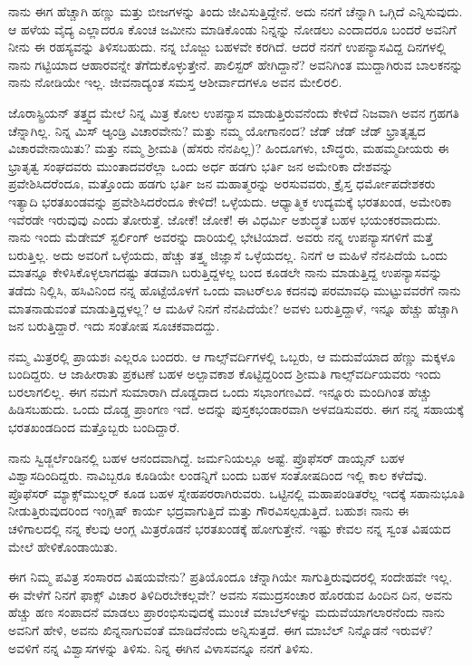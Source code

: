 ನಾನು ಈಗ ಹೆಚ್ಚಾಗಿ ಹಣ್ಣು ಮತ್ತು ಬೀಜಗಳನ್ನು ತಿಂದು ಜೀವಿಸುತ್ತಿದ್ದೇನೆ. ಅದು ನನಗೆ ಚೆನ್ನಾಗಿ ಒಗ್ಗಿದೆ ಎನ್ನಿಸುವುದು. ಆ ಹಳೆಯ ವೈದ್ಯ ಎಲ್ಲಾದರೂ ಕೊಂಚ ಜಮೀನು ಮಾಡಿಕೊಂಡು ನಿನ್ನನ್ನು ನೋಡಲು ಎಂದಾದರೂ ಬಂದರೆ ಅವನಿಗೆ ನೀನು ಈ ರಹಸ್ಯವನ್ನು ತಿಳಿಸಬಹುದು. ನನ್ನ ಬೊಜ್ಜು ಬಹಳವೇ ಕರಗಿದೆ. ಆದರೆ ನನಗೆ ಉಪನ್ಯಾಸವಿದ್ದ ದಿನಗಳಲ್ಲಿ ನಾನು ಗಟ್ಟಿಯಾದ ಆಹಾರವನ್ನೇ ತೆಗೆದುಕೊಳ್ಳುತ್ತೇನೆ. ಪಾಲಿಸ್ಟರ್ ಹೇಗಿದ್ದಾನೆ? ಅವನಿಗಿಂತ ಮುದ್ದಾಗಿರುವ ಬಾಲಕನನ್ನು ನಾನು ನೋಡಿಯೇ ಇಲ್ಲ. ಜೀವನಾದ್ಯಂತ ಸಮಸ್ತ ಆಶೀರ್ವಾದಗಳೂ ಅವನ ಮೇಲಿರಲಿ.

ಜೊರಾಸ್ಟ್ರಿಯನ್ ತತ್ತ್ವದ ಮೇಲೆ ನಿನ್ನ ಮಿತ್ರ ಕೋಲ ಉಪನ್ಯಾಸ ಮಾಡುತ್ತಿರುವನೆಂದು ಕೇಳಿದೆ\enginline{-} ನಿಜವಾಗಿ ಅವನ ಗ್ರಹಗತಿ ಚೆನ್ನಾಗಿಲ್ಲ. ನಿನ್ನ ಮಿಸ್ ಆ್ಯಂಡ್ರಿ ವಿಚಾರವೇನು? ಮತ್ತು ನಮ್ಮ ಯೋಗಾನಂದ? ಜೆಡ್ ಜೆಡ್ ಜೆಡ್ ಭ್ರಾತೃತ್ವದ ವಿಚಾರವೇನಾಯಿತು? ಮತ್ತು ನಮ್ಮ ಶ‍್ರೀಮತಿ\enginline{-} (ಹೆಸರು ನೆನಪಿಲ್ಲ)? ಹಿಂದೂಗಳು, ಬೌದ್ಧರು, ಮಹಮ್ಮದೀಯರು ಈ ಭ್ರಾತೃತ್ವ ಸಂಘದವರು ಮುಂತಾದವರೆಲ್ಲಾ ಒಂದು ಅರ್ಧ ಹಡಗು ಭರ್ತಿ ಜನ ಅಮೇರಿಕಾ ದೇಶವನ್ನು ಪ್ರವೇಶಿಸಿದರೆಂದೂ, ಮತ್ತೊಂದು ಹಡಗು ಭರ್ತಿ ಜನ ಮಹಾತ್ಮರನ್ನು ಅರಸುವವರು, ಕ್ರೈಸ್ತ ಧರ್ಮೋಪದೇಶಕರು ಇತ್ಯಾದಿ ಭರತಖಂಡವನ್ನು ಪ್ರವೇಶಿಸಿದರೆಂದೂ ಕೇಳಿದೆ! ಒಳ್ಳೆಯದು. ಆಧ್ಯಾತ್ಮಿಕ ಉದ್ಯಮಕ್ಕೆ ಭರತಖಂಡ, ಅಮೇರಿಕಾ ಇವೆರಡೇ ಇರುವುವು ಎಂದು ತೋರುತ್ತೆ. ಜೋಕೆ! ಜೋಕೆ! ಈ ವಿಧರ್ಮಿ ಅಶುದ್ಧತೆ ಬಹಳ ಭಯಂಕರವಾದುದು. ನಾನು ಇಂದು ಮೆಡೇಮ್ ಸ್ಟರ್ಲಿಂಗ್ ಅವರನ್ನು ದಾರಿಯಲ್ಲಿ ಭೇಟಿಯಾದೆ. ಅವರು ನನ್ನ ಉಪನ್ಯಾಸಗಳಿಗೆ ಮತ್ತೆ ಬರುತ್ತಿಲ್ಲ. ಅದು ಅವರಿಗೆ ಒಳ್ಳೆಯದು, ಹೆಚ್ಚು ತತ್ತ್ವ ಜಿಜ್ಞಾಸೆ ಒಳ್ಳೆಯದಲ್ಲ. ನಿನಗೆ ಆ ಮಹಿಳೆ ನೆನಪಿದೆಯೆ\enginline{-} ಒಂದು ಮಾತನ್ನೂ ಕೇಳಿಸಿಕೊಳ್ಳಲಾಗದಷ್ಟು ತಡವಾಗಿ ಬರುತ್ತಿದ್ದಳಲ್ಲ\enginline{-} ಬಂದ ಕೂಡಲೇ ನಾನು ಮಾಡುತ್ತಿದ್ದ ಉಪನ್ಯಾಸವನ್ನು ತಡೆದು ನಿಲ್ಲಿಸಿ, ಹಸಿವಿನಿಂದ ನನ್ನ ಹೊಟ್ಟೆಯೊಳಗೆ ಒಂದು ವಾಟರ್‌ಲೂ ಕದನವು ಪರಮಾವಧಿ ಮುಟ್ಟುವವರೆಗೆ ನಾನು ಮಾತನಾಡುವಂತೆ ಮಾಡುತ್ತಿದ್ದಳಲ್ಲ? ಆ ಮಹಿಳೆ ನಿನಗೆ ನೆನಪಿದೆಯೇ? ಅವಳು ಬರುತ್ತಿದ್ದಾಳೆ, ಇನ್ನೂ ಹೆಚ್ಚು ಹೆಚ್ಚಾಗಿ ಜನ ಬರುತ್ತಿದ್ದಾರೆ. ಇದು ಸಂತೋಷ ಸೂಚಕವಾದದ್ದು.

ನಮ್ಮ ಮಿತ್ರರಲ್ಲಿ ಪ್ರಾಯಶಃ ಎಲ್ಲರೂ ಬಂದರು. ಆ ಗಾಲ್ಸ್‌ವರ್ದಿಗಳಲ್ಲಿ ಒಬ್ಬರು, ಆ ಮದುವೆಯಾದ ಹೆಣ್ಣು ಮಕ್ಕಳೂ ಬಂದಿದ್ದರು. ಆ ಜಾಹೀರಾತು ಪ್ರಕಟಣೆ ಬಹಳ ಅಲ್ಪಾವಕಾಶ ಕೊಟ್ಟಿದ್ದರಿಂದ ಶ‍್ರೀಮತಿ ಗಾಲ್ಸ್‌ವರ್ದಿಯವರು ಇಂದು ಬರಲಾಗಲಿಲ್ಲ. ಈಗ ನಮಗೆ ಸುಮಾರಾಗಿ ದೊಡ್ಡದಾದ ಒಂದು ಸಭಾಂಗಣವಿದೆ. ಇನ್ನೂರು ಮಂದಿಗಿಂತ ಹೆಚ್ಚು ಹಿಡಿಸಬಹುದು. ಒಂದು ದೊಡ್ಡ ಪ್ರಾಂಗಣ ಇದೆ. ಅದನ್ನು ಪುಸ್ತಕಭಂಡಾರವಾಗಿ ಅಳವಡಿಸುವರು. ಈಗ ನನ್ನ ಸಹಾಯಕ್ಕೆ ಭರತಖಂಡದಿಂದ ಮತ್ತೊಬ್ಬರು ಬಂದಿದ್ದಾರೆ.

ನಾನು ಸ್ವಿಡ್ಜರ್ಲೆಂಡಿನಲ್ಲಿ ಬಹಳ ಆನಂದವಾಗಿದ್ದೆ. ಜರ್ಮನಿಯಲ್ಲೂ ಅಷ್ಟೆ. ಪ್ರೊಫೆಸರ್ ಡಾಯ್ಸನ್ ಬಹಳ ವಿಶ್ವಾಸದಿಂದಿದ್ದರು. ನಾವಿಬ್ಬರೂ ಕೂಡಿಯೇ ಲಂಡನ್ನಿಗೆ ಬಂದು ಬಹಳ ಸಂತೋಷದಿಂದ ಇಲ್ಲಿ ಕಾಲ ಕಳೆದೆವು. ಪ್ರೊಫೆಸರ್ ಮ್ಯಾಕ್ಸ್‌ಮುಲ್ಲರ್ ಕೂಡ ಬಹಳ ಸ್ನೇಹಪರರಾಗಿರುವರು. ಒಟ್ಟಿನಲ್ಲಿ ಮಹಾಪಂಡಿತರೆಲ್ಲ ಇದಕ್ಕೆ ಸಹಾನುಭೂತಿ ನೀಡುತ್ತಿರುವುದರಿಂದ ಇಂಗ್ಲಿಷ್ ಕಾರ್ಯ ಭದ್ರವಾಗುತ್ತಿದೆ ಮತ್ತು ಗೌರವಿಸಲ್ಪಡುತ್ತಿದೆ. ಬಹುಶಃ ನಾನು ಈ ಚಳಿಗಾಲದಲ್ಲಿ ನನ್ನ ಕೆಲವು ಆಂಗ್ಲ ಮಿತ್ರರೊಡನೆ ಭರತಖಂಡಕ್ಕೆ ಹೋಗುತ್ತೇನೆ. ಇಷ್ಟು ಕೇವಲ ನನ್ನ ಸ್ವಂತ ವಿಷಯದ ಮೇಲೆ ಹೇಳಿಕೊಂಡಾಯಿತು.

ಈಗ ನಿಮ್ಮ ಪವಿತ್ರ ಸಂಸಾರದ ವಿಷಯವೇನು? ಪ್ರತಿಯೊಂದೂ ಚೆನ್ನಾಗಿಯೇ ಸಾಗುತ್ತಿರುವುದರಲ್ಲಿ ಸಂದೇಹವೇ ಇಲ್ಲ. ಈ ವೇಳೆಗೆ ನಿನಗೆ ಫಾಕ್ಸ್ ವಿಚಾರ ತಿಳಿದಿರಬೇಕಲ್ಲವೇ? ಅವನು ಸಮುದ್ರಸಂಚಾರ ಹೊರಡುವ ಹಿಂದಿನ ದಿನ, ಅವನು ಹೆಚ್ಚು ಹಣ ಸಂಪಾದನೆ ಮಾಡಲು ಪ್ರಾರಂಭಿಸುವುದಕ್ಕೆ ಮುಂಚೆ ಮಾಬೆಲ್‌ಳನ್ನು ಮದುವೆಯಾಗಲಾರನೆಂದು ನಾನು ಅವನಿಗೆ ಹೇಳಿ, ಅವನು ಖಿನ್ನನಾಗುವಂತೆ ಮಾಡಿದೆನೆಂದು ಅನ್ನಿಸುತ್ತದೆ. ಈಗ ಮಾಬೆಲ್ ನಿನ್ನೊಡನೆ ಇರುವಳೆ? ಅವಳಿಗೆ ನನ್ನ ವಿಶ್ವಾಸಗಳನ್ನು ತಿಳಿಸು. ನಿನ್ನ ಈಗಿನ ವಿಳಾಸವನ್ನೂ ನನಗೆ ತಿಳಿಸು.

